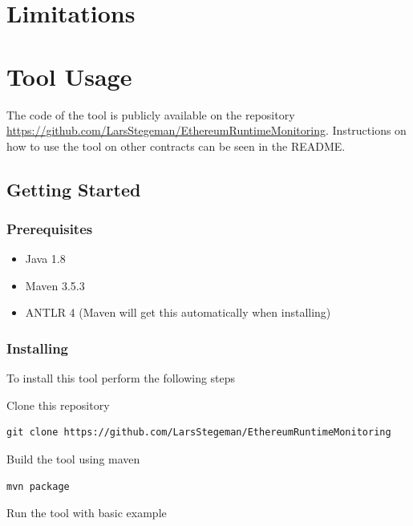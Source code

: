 \documentclass[a4paper]{article}
\begin{document}
\section{Limitations}
\label{sec:limitations}

\section{Tool Usage}
The code of the tool is publicly available on the repository \url{https://github.com/LarsStegeman/EthereumRuntimeMonitoring}. Instructions on how to use the tool on other contracts can be seen in the README.

\hypertarget{getting-started}{%
\subsection{Getting Started}\label{getting-started}}

\hypertarget{prerequisites}{%
\subsubsection{Prerequisites}\label{prerequisites}}

\begin{itemize}
\item
  Java 1.8
\item
  Maven 3.5.3
\item
  ANTLR 4 (Maven will get this automatically when installing)
\end{itemize}

\hypertarget{installing}{%
\subsubsection{Installing}\label{installing}}

To install this tool perform the following steps

Clone this repository

\begin{verbatim}
git clone https://github.com/LarsStegeman/EthereumRuntimeMonitoring
\end{verbatim}

Build the tool using maven

\begin{verbatim}
mvn package
\end{verbatim}

Run the tool with basic example
\end{document}
